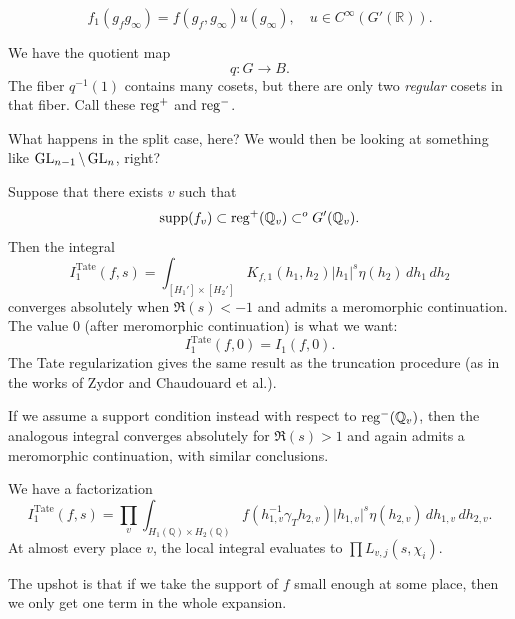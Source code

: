 \documentclass[reqno]{amsart} 
\begin{document}
\begin{equation*}
  f_1(g_f g _\infty) = f(g_f, g _\infty) u(g _\infty ), \quad u \in C^\infty(G '(\mathbb{R})).
\end{equation*}

We have the quotient map
\begin{equation*}
  q : G \rightarrow B.
\end{equation*}
The fiber $q^{-1}(1)$ contains many cosets, but there are only two \emph{regular} cosets in that fiber.  Call these $\operatorname{reg}^+$ and $\operatorname{reg}^-$.

\begin{remark}\label{remark:cnfg5j17xi}
  What happens in the split case, here?  We would then be looking at something like $\operatorname{GL}_{n-1} \backslash \operatorname{GL}_n$, right?
\end{remark}


Suppose that there exists $v$ such that
\begin{equation*}
  \operatorname{supp}(f_v) \subset \operatorname{reg}^+(\mathbb{Q}_v) \subset^o G '(\mathbb{Q}_v).
\end{equation*}
Then the integral
\begin{equation*}
  I_1^{\mathrm{Tate}}(f, s) = \int_{[H_1'] \times [H_2']}
  K_{f,1}(h_1, h_2) \lvert h_1 \rvert^s \eta(h_2) \, d h_1 \, d h_2
\end{equation*}
converges absolutely when $\Re(s) < -1$ and admits a meromorphic continuation.  The value $0$ (after meromorphic continuation) is what we want:
\begin{equation*}
  I_1^{\mathrm{Tate}}(f, 0) = I_1(f, 0).
\end{equation*}
The Tate regularization gives the same result as the truncation procedure (as in the works of Zydor and Chaudouard et al.).

If we assume a support condition instead with respect to $\operatorname{reg}^-(\mathbb{Q}_v)$, then the analogous integral converges absolutely for $\Re(s) > 1$ and again admits a meromorphic continuation, with similar conclusions.

We have a factorization
\begin{equation*}
  I_1^{\mathrm{Tate}}(f, s) = \prod_v \int_{H_1(\mathbb{Q} ) \times H_2(\mathbb{Q})} f(h_{1, v}^{-1} \gamma_T h_{2, v}) \lvert h_{1, v} \rvert^s \eta(h_{2, v}) \, d h_{1, v} \, d h_{2, v}.
\end{equation*}
At almost every place $v$, the local integral evaluates to $\prod L_{v , j}(s, \chi_i)$.

The upshot is that if we take the support of $f$ small enough at some place, then we only get one term in the whole expansion.
\end{document}
